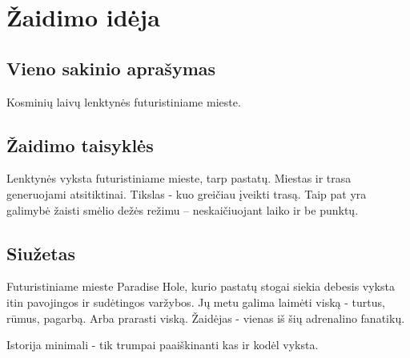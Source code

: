 \section{Žaidimo idėja}
\subsection{Vieno sakinio aprašymas}

Kosminių laivų lenktynės futuristiniame mieste.

\subsection{Žaidimo taisyklės}

Lenktynės vyksta futuristiniame mieste, tarp pastatų.
Miestas ir trasa generuojami atsitiktinai.
Tikslas - kuo greičiau įveikti trasą.
Taip pat yra galimybė žaisti smėlio dežės režimu -- neskaičiuojant laiko ir be punktų.

\subsection{Siužetas}

Futuristiniame mieste Paradise Hole, kurio pastatų stogai siekia debesis vyksta itin pavojingos ir sudėtingos varžybos.
Jų metu galima laimėti viską - turtus, rūmus, pagarbą.
Arba prarasti viską.
Žaidėjas - vienas iš šių adrenalino fanatikų.

Istorija minimali - tik trumpai paaiškinanti kas ir kodėl vyksta.